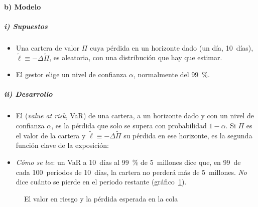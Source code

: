 \documentclass[11pt]{article}
\begin{document}
\paragraph{b) Modelo}

\subparagraph{i) Supuestos}

\begin{itemize}
\item Una cartera de valor $\Pi$ cuya pérdida en un horizonte dado (un día, 10~días), $\tilde\ell\equiv-\Delta\tilde\Pi$, es aleatoria, con una distribución que hay que estimar.
\item El gestor elige un nivel de confianza $\alpha$, normalmente del 99~\%.
\end{itemize}

\subparagraph{ii) Desarrollo}

\begin{itemize}
\item El  (\emph{value at risk}, VaR) de una cartera, a un horizonte dado y con un nivel de confianza $\alpha$, es la pérdida que solo se supera con probabilidad $1-\alpha$. Si $\Pi$ es el valor de la cartera y $\tilde\ell\equiv-\Delta\tilde\Pi$ su pérdida en ese horizonte, es la segunda función clave de la exposición:
\item \emph{Cómo se lee}: un VaR a 10~días al 99~\% de 5~millones dice que, en 99~de cada 100~periodos de 10~días, la cartera no perderá más de 5~millones. \emph{No} dice cuánto se pierde en el periodo restante (gráfico~\ref{fig:var}).
\end{itemize}

\begin{figure}[H]
\centering
\caption{El valor en riesgo y la pérdida esperada en la cola}\label{fig:var}
\end{figure}
\end{document}
